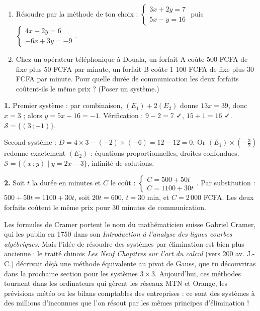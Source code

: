 \documentclass[11pt]{article}
\newcommand{\cle}[1]{{\popxbold\color{popdark}#1}}
\begin{document}
\begin{exercice}
\begin{enumerate}
\item Résoudre par la méthode de ton choix : $\begin{cases} 3x + 2y = 7 \\ 5x - y = 16 \end{cases}$ puis $\begin{cases} 4x - 2y = 6 \\ -6x + 3y = -9 \end{cases}$.
\item Chez un opérateur téléphonique à Douala, un forfait A coûte 500 FCFA de fixe plus 50 FCFA par minute, un forfait B coûte 1 100 FCFA de fixe plus 30 FCFA par minute. Pour quelle durée de communication les deux forfaits coûtent-ils le même prix ? (Poser un système.)
\end{enumerate}
\end{exercice}

\begin{corrige}[Exercice 1]
\textbf{1.} Premier système : par combinaison, $(E_1) + 2(E_2)$ donne $13x = 39$, donc $x = 3$ ; alors $y = 5x - 16 = -1$. Vérification : $9 - 2 = 7$ ✓, $15 + 1 = 16$ ✓. $\mathcal{S} = \{(3\,;-1)\}$.

Second système : $D = 4\times 3 - (-2)\times(-6) = 12 - 12 = 0$. Or $(E_1) \times (-\tfrac{3}{2})$ redonne exactement $(E_2)$ : équations proportionnelles, droites confondues. $\mathcal{S} = \{(x\,;y) \mid y = 2x - 3\}$, infinité de solutions.

\textbf{2.} Soit $t$ la durée en minutes et $C$ le coût : $\begin{cases} C = 500 + 50t \\ C = 1100 + 30t \end{cases}$. Par substitution : $500 + 50t = 1100 + 30t$, soit $20t = 600$, $t = 30$ min, et $C = 2\,000$ FCFA. Les deux forfaits coûtent le même prix pour 30 minutes de communication.
\end{corrige}

\begin{savaistu}
Les \cle{formules de Cramer} portent le nom du mathématicien suisse Gabriel Cramer, qui les publia en 1750 dans son \emph{Introduction à l'analyse des lignes courbes algébriques}. Mais l'idée de résoudre des systèmes par élimination est bien plus ancienne : le traité chinois \emph{Les Neuf Chapitres sur l'art du calcul} (vers 200 av. J.-C.) décrivait déjà une méthode équivalente au pivot de Gauss, que tu découvriras dans la prochaine section pour les systèmes $3\times 3$. Aujourd'hui, ces méthodes tournent dans les ordinateurs qui gèrent les réseaux MTN et Orange, les prévisions météo ou les bilans comptables des entreprises : ce sont des systèmes à des millions d'inconnues que l'on résout par les mêmes principes d'élimination !
\end{savaistu}
\end{document}
